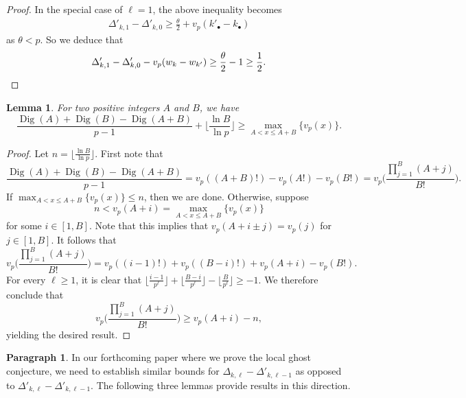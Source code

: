 \documentclass[12pt]{amsart}
\newtheorem{lemma}[subsection]{Lemma}
\theoremstyle{definition}
\newtheorem{para}[subsection]{Paragraph}
\numberwithin{equation}{subsection}
\DeclareMathOperator{\Dig}{Dig}
\begin{document}
\begin{proof}
In the special case of $\ell=1$, the above inequality becomes
\begin{align*}
\Delta'_{k,1} - \Delta'_{k,0}\geq \frac \theta 2+v_p(k'_\bullet - k_\bullet)
\end{align*}
as $\theta<p$. So we deduce that
\[
\Delta'_{k,1}-\Delta'_{k,0}-v_p(w_{k} - w_{k'})\geq \frac \theta 2 - 1 \geq \frac 12. \qedhere
\]


\end{proof}


\begin{lemma}
\label{L:elementary Digits lemma}For two positive integers $A$ and $B$, we have 
	\[
	\frac{\Dig(A)+\Dig(B)-\Dig(A+B)}{p-1}+\Big\lfloor \frac{\ln B}{\ln p}\Big\rfloor\geq \max_{A<x\leq A+B}\{ v_p(x) \}.
	\]
\end{lemma}
\begin{proof}
Let $n=\lfloor \frac{\ln B}{\ln p}\rfloor$. First note that
\[
	\frac{\Dig(A)+\Dig(B)-\Dig(A+B)}{p-1}=v_p((A+B)!)-v_p(A!)-v_p(B!)=v_p\Big(\frac{\prod_{j=1}^B (A+j)}{B!} \Big).
	\]
If $\max_{A<x\leq A+B}\{ v_p(x) \}\leq n$, then we are done. Otherwise, suppose 
\[
n<v_p(A+i)=\max_{A<x\leq A+B}\{ v_p(x)\}
\]
for some $i\in [1, B]$. Note that this implies that $v_p(A+i\pm j)=v_p(j)$ for $j\in[1, B]$. It follows that 
\[
v_p\Big(\frac{\prod_{j=1}^B (A+j)}{B!} \Big)=v_p((i-1)!)+v_p((B-i)!)+v_p(A+i)-v_p(B!).
\]
For every $\ell\geq1$, it is clear that $\lfloor \frac{i-1}{p^\ell}\rfloor+\lfloor \frac{B-i}{p^\ell}\rfloor-\lfloor \frac{B}{p^\ell}\rfloor\geq-1$. We therefore conclude that
\[
v_p\Big(\frac{\prod_{j=1}^B (A+j)}{B!} \Big)\geq v_p(A+i)-n,
\]
yielding the desired result.
\end{proof}


\begin{para}
\label{P:para_156}
In our forthcoming paper where we prove the local ghost conjecture, we need to establish similar bounds for $\Delta_{k, \ell} - \Delta'_{k, \ell-1}$ as opposed to $\Delta'_{k, \ell} - \Delta'_{k, \ell-1}$. The following three lemmas provide results in this direction.
\end{para}
\end{document}
